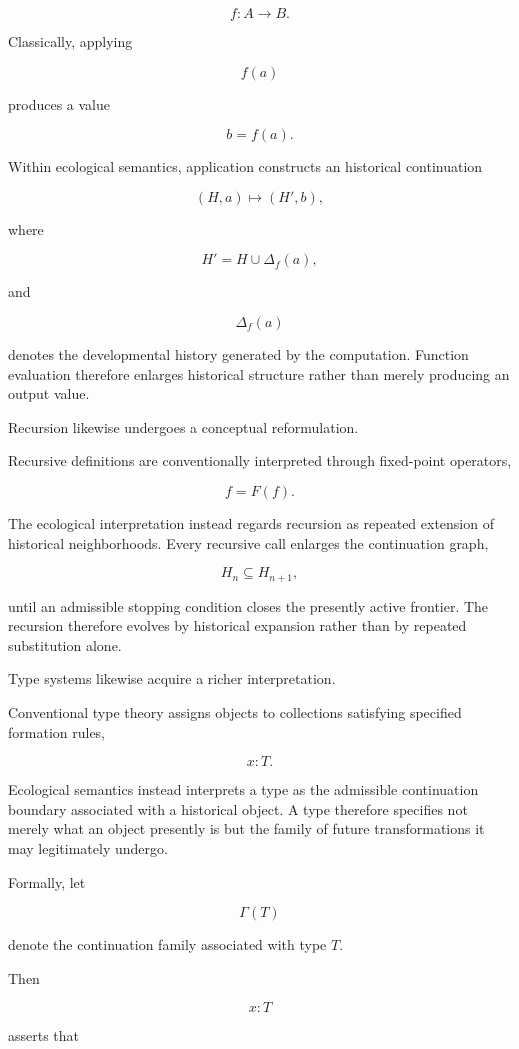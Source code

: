 \documentclass[12pt,oneside]{article}
\theoremstyle{remark}
\begin{document}
\[
f
:
A
\rightarrow
B.
\]

Classically, applying

\[
f(a)
\]

produces a value

\[
b
=
f(a).
\]

Within ecological semantics, application constructs an historical continuation

\[
(H,a)
\longmapsto
(H',b),
\]

where

\[
H'
=
H
\cup
\Delta_f(a),
\]

and

\[
\Delta_f(a)
\]

denotes the developmental history generated by the computation. Function
evaluation therefore enlarges historical structure rather than merely producing
an output value.

Recursion likewise undergoes a conceptual reformulation.

Recursive definitions are conventionally interpreted through fixed-point
operators,

\[
f
=
F(f).
\]

The ecological interpretation instead regards recursion as repeated extension
of historical neighborhoods. Every recursive call enlarges the continuation
graph,

\[
H_n
\subseteq
H_{n+1},
\]

until an admissible stopping condition closes the presently active frontier.
The recursion therefore evolves by historical expansion rather than by repeated
substitution alone.

Type systems likewise acquire a richer interpretation.

Conventional type theory assigns objects to collections satisfying specified
formation rules,

\[
x
:
T.
\]

Ecological semantics instead interprets a type as the admissible continuation
boundary associated with a historical object. A type therefore specifies not
merely what an object presently is but the family of future transformations it
may legitimately undergo.

Formally, let

\[
\Gamma(T)
\]

denote the continuation family associated with type \(T\).

Then

\[
x:T
\]

asserts that
\end{document}
